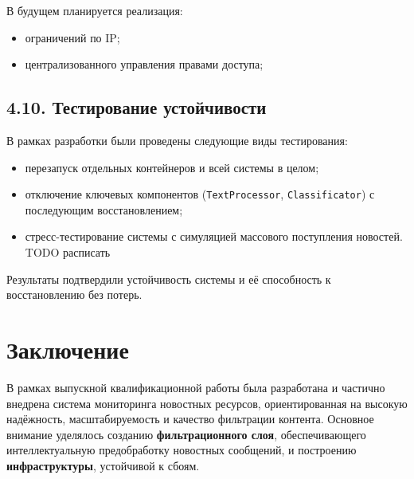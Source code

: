 В будущем планируется реализация:

\begin{itemize}
\tightlist
\item
  ограничений по IP;\\
\item
  централизованного управления правами доступа;
\end{itemize}

\hypertarget{ux442ux435ux441ux442ux438ux440ux43eux432ux430ux43dux438ux435-ux443ux441ux442ux43eux439ux447ux438ux432ux43eux441ux442ux438}{%
\subsection{4.10. Тестирование
устойчивости}\label{ux442ux435ux441ux442ux438ux440ux43eux432ux430ux43dux438ux435-ux443ux441ux442ux43eux439ux447ux438ux432ux43eux441ux442ux438}}

В рамках разработки были проведены следующие виды тестирования:

\begin{itemize}
\tightlist
\item
  перезапуск отдельных контейнеров и всей системы в целом;\\
\item
  отключение ключевых компонентов (\texttt{TextProcessor},
  \texttt{Classificator}) с последующим восстановлением;\\
\item
  стресс-тестирование системы с симуляцией массового поступления
  новостей. TODO расписать
\end{itemize}

Результаты подтвердили устойчивость системы и её способность к
восстановлению без потерь.

\hypertarget{ux437ux430ux43aux43bux44eux447ux435ux43dux438ux435}{%
\section{Заключение}\label{ux437ux430ux43aux43bux44eux447ux435ux43dux438ux435}}

В рамках выпускной квалификационной работы была разработана и частично
внедрена система мониторинга новостных ресурсов, ориентированная на
высокую надёжность, масштабируемость и качество фильтрации контента.
Основное внимание уделялось созданию \textbf{фильтрационного слоя},
обеспечивающего интеллектуальную предобработку новостных сообщений, и
построению \textbf{инфраструктуры}, устойчивой к сбоям.

